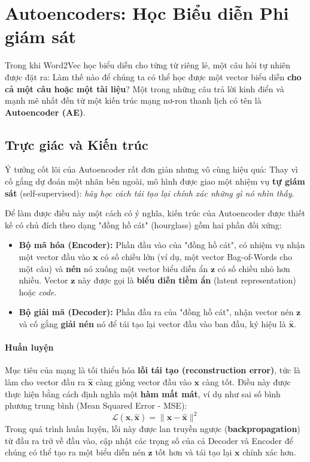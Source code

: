 
\section{Autoencoders: Học Biểu diễn Phi giám sát}
\label{ssec:autoencoders}

Trong khi Word2Vec học biểu diễn cho từng từ riêng lẻ, một câu hỏi tự nhiên được đặt ra: Làm thế nào để chúng ta có thể học được một vector biểu diễn \textbf{cho cả một câu hoặc một tài liệu}? Một trong những câu trả lời kinh điển và mạnh mẽ nhất đến từ một kiến trúc mạng nơ-ron thanh lịch có tên là \textbf{Autoencoder (AE)}.

\subsection{Trực giác và Kiến trúc}

Ý tưởng cốt lõi của Autoencoder rất đơn giản nhưng vô cùng hiệu quả: Thay vì cố gắng dự đoán một nhãn bên ngoài, mô hình được giao một nhiệm vụ \textbf{tự giám sát} (self-supervised): \textit{hãy học cách tái tạo lại chính xác những gì nó nhìn thấy}.

Để làm được điều này một cách có ý nghĩa, kiến trúc của Autoencoder được thiết kế có chủ đích theo dạng "đồng hồ cát" (hourglass) gồm hai phần đối xứng:

\begin{itemize}
    \item \textbf{Bộ mã hóa (Encoder):} Phần đầu vào của "đồng hồ cát", có nhiệm vụ nhận một vector đầu vào $\mathbf{x}$ có số chiều lớn (ví dụ, một vector Bag-of-Words cho một câu) và \textbf{nén} nó xuống một vector biểu diễn ẩn $\mathbf{z}$ có số chiều nhỏ hơn nhiều. Vector $\mathbf{z}$ này được gọi là \textbf{biểu diễn tiềm ẩn} (latent representation) hoặc \textit{code}.
    \item \textbf{Bộ giải mã (Decoder):} Phần đầu ra của "đồng hồ cát", nhận vector nén $\mathbf{z}$ và cố gắng \textbf{giải nén} nó để tái tạo lại vector đầu vào ban đầu, ký hiệu là $\hat{\mathbf{x}}$.
\end{itemize}

\paragraph{Huấn luyện}
Mục tiêu của mạng là tối thiểu hóa \textbf{lỗi tái tạo (reconstruction error)}, tức là làm cho vector đầu ra $\hat{\mathbf{x}}$ càng giống vector đầu vào $\mathbf{x}$ càng tốt. Điều này được thực hiện bằng cách định nghĩa một \textbf{hàm mất mát}, ví dụ như sai số bình phương trung bình (Mean Squared Error - MSE):
$$ \mathcal{L}(\mathbf{x}, \hat{\mathbf{x}}) = \|\mathbf{x} - \hat{\mathbf{x}}\|^2 $$
Trong quá trình huấn luyện, lỗi này được lan truyền ngược (\textbf{backpropagation}) từ đầu ra trở về đầu vào, cập nhật các trọng số của cả Decoder và Encoder để chúng có thể tạo ra một biểu diễn nén $\mathbf{z}$ tốt hơn và tái tạo lại $\mathbf{x}$ chính xác hơn.

